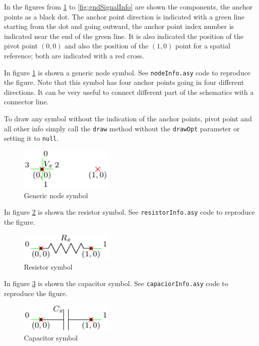 \documentclass[a4paper,12pt]{report}
\begin{document}
In the figures from \ref{fig:nodeInfo} to \ref{fig:gndSignalInfo} are shown the components, the anchor points as a black dot. The anchor point direction is indicated with a green line starting from the dot and going outward, the anchor point index number is indicated near the end of the green line. It is also indicated the position of the pivot point $(0,0)$ and also the position of the $(1,0)$ point for a spatial reference; both are indicated with a red cross.

In figure \ref{fig:nodeInfo} is shown a generic node symbol. See \texttt{nodeInfo.asy} code to reproduce the figure. Note that this symbol has four anchor points going in four different directions. It can be very useful to connect different part of the schematics with a connector line.

To draw any symbol without the indication of the anchor points, pivot point and all other info simply call the \texttt{draw} method without the \texttt{drawOpt} parameter or setting it to \texttt{null}.   

\begin{figure}[ht]
\centering
\includegraphics[width=0.4\textwidth]{nodeInfo}
\caption{Generic node symbol}
\label{fig:nodeInfo}
\end{figure}

In figure \ref{fig:resistorInfo} is shown the resistor symbol. See \texttt{resistorInfo.asy} code to reproduce the figure.

\begin{figure}[ht]
\centering
\includegraphics[width=0.4\textwidth]{resistorInfo}
\caption{Resistor symbol}
\label{fig:resistorInfo}
\end{figure}

In figure \ref{fig:capaciorInfo} is shown the capacitor symbol. See \texttt{capaciorInfo.asy} code to reproduce the figure.

\begin{figure}[ht]
\centering
\includegraphics[width=0.4\textwidth]{capacitorInfo}
\caption{Capacitor symbol}
\label{fig:capaciorInfo}
\end{figure}
\end{document}
